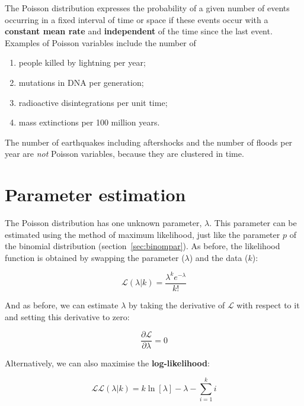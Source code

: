 The Poisson distribution expresses the probability of a given number
of events occurring in a fixed interval of time or space if these
events occur with a \textbf{constant mean rate} and
\textbf{independent} of the time since the last event. Examples of
Poisson variables include the number of

\begin{enumerate}
\item people killed by lightning per year;
\item mutations in DNA per generation;
\item radioactive disintegrations per unit time;
\item mass extinctions per 100 million years.
\end{enumerate}

The number of earthquakes including aftershocks and the number of
floods per year are \emph{not} Poisson variables, because they are
clustered in time.

\section{Parameter estimation}
\label{sec:poispar}

The Poisson distribution has one unknown parameter, $\lambda$. This
parameter can be estimated using the method of maximum likelihood,
just like the parameter $p$ of the binomial distribution
(section~\ref{sec:binompar}). As before, the likelihood function is
obtained by swapping the parameter ($\lambda$) and the data ($k$):

\begin{equation}
  \mathcal{L}(\lambda|k) = \frac{\lambda^k e^{-\lambda}}{k!}
  \label{eq:poislik}
\end{equation}

And as before, we can estimate $\lambda$ by taking the derivative of
$\mathcal{L}$ with respect to it and setting this derivative to zero:

\begin{equation}
  \frac{\partial{\mathcal{L}}}{\partial{\lambda}} = 0
\end{equation}

Alternatively, we can also maximise the \textbf{log-likelihood}:

\begin{equation}
  \mathcal{LL}(\lambda|k) = k \ln[\lambda] - \lambda - \sum\limits_{i=1}^{k}i
  \label{eq:poisLL}
\end{equation}

